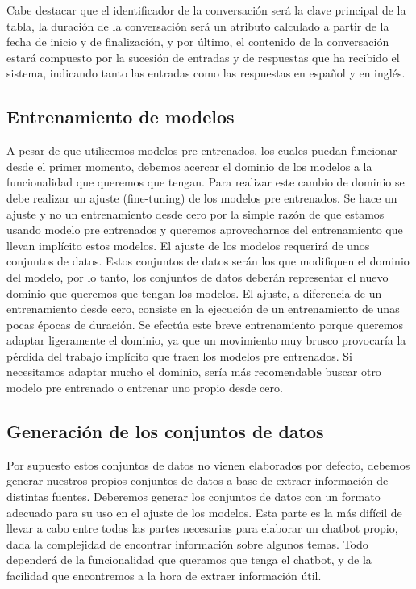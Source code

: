 Cabe destacar que el identificador de la conversación será la clave principal de la tabla, la duración de la conversación será un atributo calculado a partir de la fecha de inicio y de finalización, y por último, el contenido de la conversación estará compuesto por la sucesión de entradas y de respuestas que ha recibido el sistema, indicando tanto las entradas como las respuestas en español y en inglés.

\subsection*{Entrenamiento de modelos}

A pesar de que utilicemos modelos pre entrenados, los cuales puedan funcionar desde el primer momento, debemos acercar el dominio de los modelos a la funcionalidad que queremos que tengan. Para realizar este cambio de dominio se debe realizar un ajuste (fine-tuning) de los modelos pre entrenados. Se hace un ajuste y no un entrenamiento desde cero por la simple razón de que estamos usando modelo pre entrenados y queremos aprovecharnos del entrenamiento que llevan implícito estos modelos. El ajuste de los modelos requerirá de unos conjuntos de datos. Estos conjuntos de datos serán los que modifiquen el dominio del modelo, por lo tanto, los conjuntos de datos deberán representar el nuevo dominio que queremos que tengan los modelos. El ajuste, a diferencia de un entrenamiento desde cero, consiste en la ejecución de un entrenamiento de unas pocas épocas de duración. Se efectúa este breve entrenamiento porque queremos adaptar ligeramente el dominio, ya que un movimiento muy brusco provocaría la pérdida del trabajo implícito que traen los modelos pre entrenados. Si necesitamos adaptar mucho el dominio, sería más recomendable buscar otro modelo pre entrenado o entrenar uno propio desde cero.

\subsection*{Generación de los conjuntos de datos}

Por supuesto estos conjuntos de datos no vienen elaborados por defecto, debemos generar nuestros propios conjuntos de datos a base de extraer información de distintas fuentes. Deberemos generar los conjuntos de datos con un formato adecuado para su uso en el ajuste de los modelos. Esta parte es la más difícil de llevar a cabo entre todas las partes necesarias para elaborar un chatbot propio, dada la complejidad de encontrar información sobre algunos temas. Todo dependerá de la funcionalidad que queramos que tenga el chatbot, y de la facilidad que encontremos a la hora de extraer información útil.

